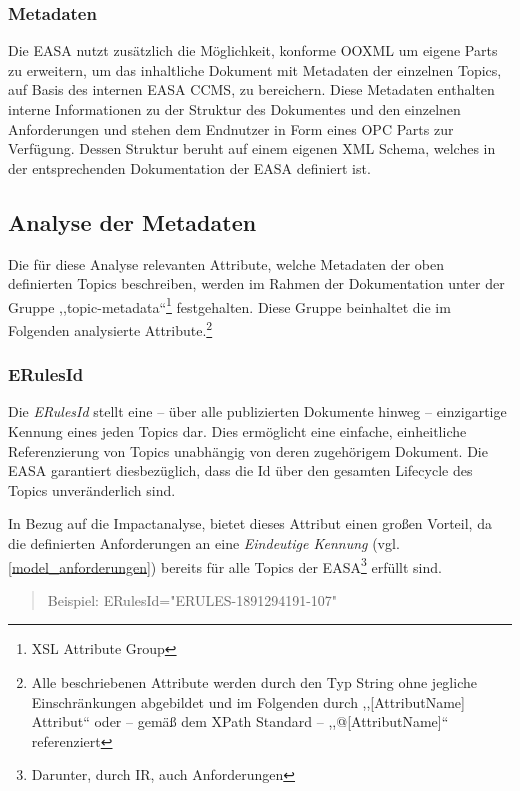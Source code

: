             \subsubsection{Metadaten}

    Die \ac{EASA} nutzt zusätzlich die Möglichkeit, konforme \ac{OOXML} um eigene Parts zu erweitern, um das inhaltliche Dokument mit Metadaten der einzelnen Topics, auf Basis des internen \ac{EASA} \ac{CCMS}, zu bereichern.
    Diese Metadaten enthalten interne Informationen zu der Struktur des Dokumentes und den einzelnen Anforderungen und stehen dem Endnutzer in Form eines \ac{OPC} Parts  zur Verfügung.
    Dessen Struktur beruht auf einem eigenen \ac{XML} Schema, welches in der entsprechenden Dokumentation der \ac{EASA} definiert ist.

\pagebreak
\subsection{Analyse der Metadaten}

    Die für diese Analyse relevanten Attribute, welche Metadaten der oben definierten Topics beschreiben, werden im Rahmen der Dokumentation unter der Gruppe ,,\textsf{topic-metadata}``\footnote{\ac{XSL} Attribute Group} festgehalten.
    Diese Gruppe beinhaltet die im Folgenden analysierte Attribute.\footnote{Alle beschriebenen Attribute werden durch den Typ String ohne jegliche Einschränkungen abgebildet und im Folgenden durch ,,[AttributName] Attribut`` oder -- gemäß dem XPath Standard -- ,,@[AttributName]`` referenziert} \cite[9]{easa_xml_schema}

    \subsubsection{ERulesId}

Die \textit{ERulesId} stellt eine -- über alle publizierten Dokumente hinweg -- einzigartige Kennung eines jeden Topics dar.
Dies ermöglicht eine einfache, einheitliche Referenzierung von Topics unabhängig von deren zugehörigem Dokument.
Die \ac{EASA} garantiert diesbezüglich, dass die Id über den gesamten Lifecycle des Topics unveränderlich sind. \cite[17]{easa_xml_doc}

In Bezug auf die Impactanalyse, bietet dieses Attribut einen großen Vorteil, da die definierten Anforderungen an eine \textit{Eindeutige Kennung} (vgl. \ref{model_anforderungen}) bereits für alle Topics der \ac{EASA}\footnote{Darunter, durch \ac{IR}, auch \atmans Anforderungen} erfüllt sind.
\begin{quote}
Beispiel:
\textsf{ERulesId="{}ERULES-1891294191-107"}
\end{quote}

